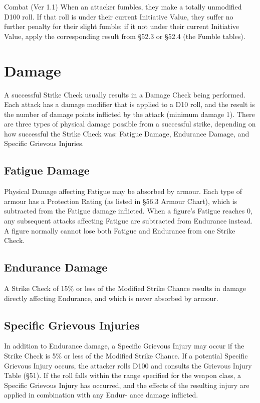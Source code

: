 \begin{Chapter}{Combat (Ver 1.1)}
When an attacker fumbles, they make a totally unmodified D100 roll.
If that roll is under their current Initiative Value, they suffer no
further penalty for their slight fumble; if it not under their current
Initiative Value, apply the corresponding result from §52.3 or §52.4
(the Fumble tables).

\section{Damage}

A successful Strike Check usually results in a Damage Check being
performed. Each attack has a damage modifier that is applied to a D10
roll, and the result is the number of damage points inflicted by the
attack (minimum damage 1). There are three types of physical damage
possible from a successful strike, depending on how successful the
Strike Check was: Fatigue Damage, Endurance Damage, and Specific
Grievous Injuries.

\subsection{Fatigue Damage}

Physical Damage affecting Fatigue may be absorbed by armour.  Each
type of armour has a Protection Rating (as listed in §56.3 Armour
Chart), which is subtracted from the Fatigue damage inflicted.  When
a figure’s Fatigue reaches 0, any subsequent attacks affecting Fatigue
are subtracted from Endurance instead. A figure normally cannot lose
both Fatigue and Endurance from one Strike Check.

\subsection{Endurance Damage}

A Strike Check of 15\% or less of the Modified Strike Chance results
in damage directly affecting Endurance, and which is never absorbed by
armour.

\subsection{Specific Grievous Injuries}

In addition to Endurance damage, a Specific Grievous Injury may occur
if the Strike Check is 5\% or less of the Modified Strike Chance.  If
a potential Specific Grievous Injury occurs, the attacker rolls D100
and consults the Grievous Injury Table (§51). If the roll falls within
the range specified for the weapon class, a Specific Grievous Injury
has occurred, and the effects of the resulting injury are applied in
combination with any Endur- ance damage inflicted.


\end{Chapter}
